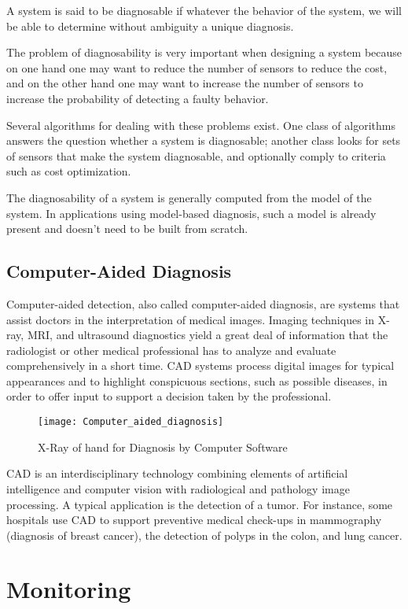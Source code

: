 \documentclass[12pt]{article}
\begin{document}
A system is said to be diagnosable if whatever the behavior of the system, we will be able to determine without ambiguity a unique diagnosis.

The problem of diagnosability is very important when designing a system because on one hand one may want to reduce the number of sensors to reduce the cost, and on the other hand one may want to increase the number of sensors to increase the probability of detecting a faulty behavior.

Several algorithms for dealing with these problems exist. One class of algorithms answers the question whether a system is diagnosable; another class looks for sets of sensors that make the system diagnosable, and optionally comply to criteria such as cost optimization.

The diagnosability of a system is generally computed from the model of the system. In applications using model-based diagnosis, such a model is already present and doesn't need to be built from scratch.

\subsection{Computer-Aided Diagnosis}

Computer-aided detection, also called computer-aided diagnosis, are systems that assist doctors in the interpretation of medical images. Imaging techniques in X-ray, MRI, and ultrasound diagnostics yield a great deal of information that the radiologist or other medical professional has to analyze and evaluate comprehensively in a short time. CAD systems process digital images for typical appearances and to highlight conspicuous sections, such as possible diseases, in order to offer input to support a decision taken by the professional.

\begin{figure}[ht]
\centering
\texttt{[image: Computer\_aided\_diagnosis]}
\caption{X-Ray of hand for Diagnosis by Computer Software}
\end{figure}

CAD is an interdisciplinary technology combining elements of artificial intelligence and computer vision with radiological and pathology image processing. A typical application is the detection of a tumor. For instance, some hospitals use CAD to support preventive medical check-ups in mammography (diagnosis of breast cancer), the detection of polyps in the colon, and lung cancer.

\section{Monitoring}
\end{document}
